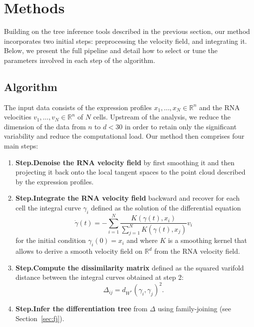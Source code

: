 \documentclass[pdflatex,sn-mathphys-num]{sn-jnl}%
\theoremstyle{thmstyleone}%
\theoremstyle{thmstyletwo}%
\theoremstyle{thmstylethree}%
\newcommand{\bR}{\mathbb R}
\begin{document}
\section{Methods}\label{sec:methods}
Building on the tree inference tools described in the previous section, our method incorporates two initial steps: preprocessing the velocity field, and integrating it. Below, we present the full pipeline and detail how to select or tune the parameters involved in each step of the algorithm.

\subsection{Algorithm}
The input data consists of the expression profiles $x_1, \dots, x_N \in \bR^n$ and the RNA velocities $v_1, \dots, v_N \in \bR^n$ of $N$ cells. Upstream of the analysis, we reduce the dimension of the data from $n$ to $d < 30$ in order to retain only the significant variability and reduce the computational load. Our method then comprises four main steps:
\vspace{-.2cm}
\begin{enumerate}[label={}]
    \item\textbf{Step.\;Denoise the RNA velocity field} by first smoothing it and then projecting it back onto the local tangent spaces to the point cloud described by the expression profiles. 
    \medbreak
    \item\textbf{Step.\;Integrate the RNA velocity field} backward and recover for each cell the integral curve $\gamma_i$ defined as the solution of the differential equation
    \begin{equation}
       \dot\gamma(t) = - \sum_{i=1}^N\frac{K(\gamma(t), x_i)}{\sum_{j=1}^N K(\gamma(t), x_j)}v_i
    \end{equation}
    for the initial condition $\gamma_i(0) = x_i$ and where $K$ is a smoothing kernel that allows to derive a smooth velocity field on $\bR^d$ from the RNA velocity field.
    \medbreak
    \item\textbf{Step.\;Compute the dissimilarity matrix} defined as the squared varifold distance between the integral curves obtained at step 2:
    \begin{equation}
        \Delta_{ij} =  d_{W^\ast}(\gamma_{i}, \gamma_{j})^2.
    \end{equation}
    \medbreak
    \item\textbf{Step.\;Infer the differentiation tree} from $\Delta$ using family-joining (see Section~\ref{sec:fj}). 
\end{enumerate}
\end{document}
